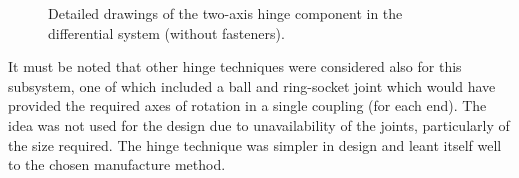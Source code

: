         \begin{figure}[h!]
        \centering
        \caption[Detailed drawings of the two-axis hinge component in the differential system (without fasteners).]{Detailed drawings of the two-axis hinge component in the differential system (without fasteners).}
        \label{fig:mechDesign-twoAxisHingeDetail}
        \end{figure}
        
        It must be noted that other hinge techniques were considered also for this subsystem, one of which included a ball and ring-socket joint which would have provided the required axes of rotation in a single coupling (for each end). The idea was not used for the design due to unavailability of the joints, particularly of the size required. The hinge technique was simpler in design and leant itself well to the chosen manufacture method.
        
